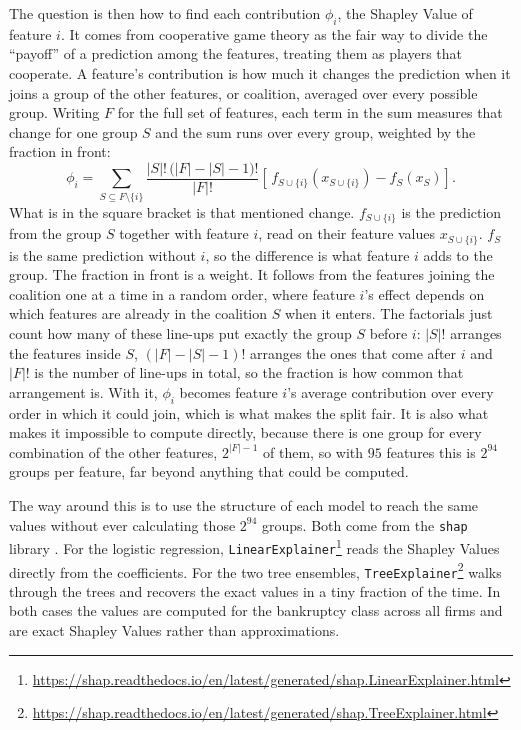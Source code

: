 The question is then how to find each contribution $\phi_i$, the Shapley Value of
feature $i$. It comes from cooperative game theory as the fair way to divide the
``payoff'' of a prediction among the features, treating them as players that
cooperate. A feature's contribution is how much it changes the prediction when it
joins a group of the other features, or coalition, averaged over every possible
group. Writing $F$ for the full set of features, each term in the sum measures that
change for one group $S$ and the sum runs over every group, weighted by the
fraction in front:
\begin{equation}
  \phi_i = \sum_{S \subseteq F \setminus \{i\}}
  \frac{|S|!\,\bigl(|F| - |S| - 1\bigr)!}{|F|!}
  \left[\, f_{S \cup \{i\}}\!\left(x_{S \cup \{i\}}\right) - f_S\!\left(x_S\right) \right].
  \label{eq:shap-shapley}
\end{equation}
What is in the square bracket is that mentioned change. $f_{S \cup \{i\}}$ is the 
prediction from the
group $S$ together with feature $i$, read on their feature values
$x_{S \cup \{i\}}$. $f_S$ is the same prediction without $i$, so the difference
is what feature $i$ adds to the group. The fraction in front is a weight. It follows 
from the features joining the coalition
one at a time in a random order, where feature $i$'s effect depends on which features 
are already in the coalition $S$ when
it enters. The factorials just count how
many of these line-ups put exactly the group $S$ before $i$: $|S|!$ arranges the
features inside $S$, $(|F| - |S| - 1)!$ arranges the ones that come after $i$ and
$|F|!$ is the number of line-ups in total, so the fraction is how common that
arrangement is. With it, $\phi_i$ becomes feature $i$'s average contribution over
every order in which it could join, which is what makes the split fair. It is also
what makes it impossible to compute directly, because there is one group for every
combination of the other features, $2^{|F|-1}$ of them, so with $95$ features this is
$2^{94}$ groups per feature, far beyond anything that could be computed.

The way around this is to use the structure of each model to reach the same values
without ever calculating those $2^{94}$ groups. Both come from the \texttt{shap}
library \parencite{lundberg2017}. For the logistic regression, 
\texttt{LinearExplainer}\footnote{\url{https://shap.readthedocs.io/en/latest/generated/shap.LinearExplainer.html}}
reads the Shapley Values directly from the coefficients. For the two tree ensembles,
\texttt{TreeExplainer}\footnote{\url{https://shap.readthedocs.io/en/latest/generated/shap.TreeExplainer.html}} 
walks through the trees and recovers the exact values in a
tiny fraction of the time. In both cases the values are computed for the 
bankruptcy class across all firms and are exact Shapley Values rather than 
approximations.

